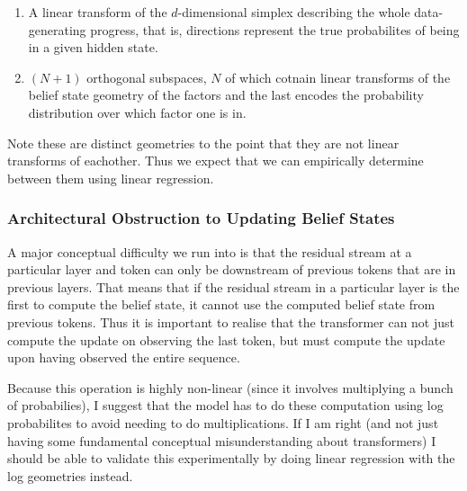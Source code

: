 \documentclass[11pt,a4paper]{article}
\begin{document}
\begin{enumerate}
\item A linear transform of the $d$-dimensional simplex describing the whole data-generating progress, that is, directions represent the true probabilites of being in a given hidden state.
\item $(N+1)$ orthogonal subspaces, $N$ of which cotnain linear transforms of the belief state geometry of the factors and the last encodes the probability distribution over which factor one is in.
\end{enumerate}

Note these are distinct geometries to the point that they are not linear transforms of eachother. Thus we expect that we can empirically determine between them using linear regression.
\vspace{5mm}

\subsubsection*{Architectural Obstruction to Updating Belief States}


A major conceptual difficulty we run into is that the residual stream at a particular layer and token can only be downstream of previous tokens that are in previous layers. That means that if the residual stream in a particular layer is the first to compute the belief state, it cannot use the computed belief state from previous tokens. Thus it is important to realise that the transformer can not just compute the update on observing the last token, but must compute the update upon having observed the entire sequence. 

\vspace{5mm}

Because this operation is highly non-linear (since it involves multiplying a bunch of probabilies), I suggest that the model has to do these computation using log probabilites to avoid needing to do multiplications. If I am right (and not just having some fundamental conceptual misunderstanding about transformers) I should be able to validate this experimentally by doing linear regression with the log geometries instead.
\end{document}
